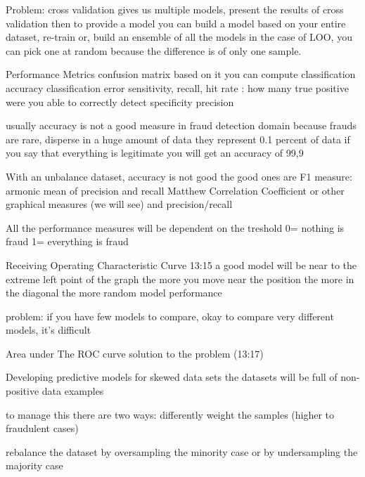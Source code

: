             Problem:
                cross validation gives us multiple models, 
                    present the results of cross validation 
                    then to provide a model you can build a model based on your entire dataset, re-train 
                    or, build an ensemble of all the models 
                    in the case of LOO, you can pick one at random because the difference is of only one sample.
    
    Performance Metrics 
        confusion matrix 
        based on it you can compute
        classification accuracy
        classification error
        sensitivity, recall, hit rate : how many true positive were you able to correctly detect
        specificity
        precision

        usually accuracy is not a good measure in fraud detection domain
        because frauds are rare, disperse in a huge amount of data 
        they represent 0.1 percent of data 
        if you say that everything is legitimate you will get an accuracy of 99,9

        With an unbalance dataset, accuracy is not good 
        the good ones are F1 measure: armonic mean of precision and recall 
        Matthew Correlation Coefficient
        or other graphical measures (we will see)
        and precision/recall 

        All the performance measures will be dependent on the treshold 
        0= nothing is fraud 
        1= everything is fraud

        Receiving Operating Characteristic Curve 
         13:15
         a good model will be near to the extreme left point of the graph 
        the more you move near the position 
        the more in the diagonal the more random model performance 

        problem: if you have few models to compare, okay 
                to compare very different models, it's difficult 

        Area under The ROC curve 
            solution to the problem (13:17)
        
    Developing predictive models for skewed data sets 
        the datasets will be full of non-positive data examples

        to manage this there are two ways:
            differently weight the samples (higher to fraudulent cases)

            rebalance the dataset by oversampling the minority case or by undersampling the majority case 

